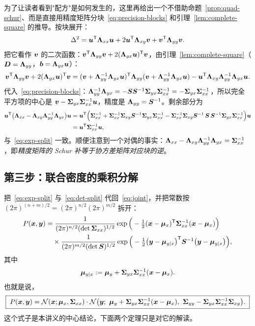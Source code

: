 为了让读者看到"配方"是如何发生的，这里再给出一个不借助命题~\ref{prop:quad-schur}、而是直接用精度矩阵分块~\eqref{eq:precision-blocks} 和引理~\ref{lem:complete-square} 的推导。按块展开：
\[
\Delta^2=\bm{u}^{\mathsf{T}}\bm{\Lambda}_{xx}\bm{u}+2\bm{u}^{\mathsf{T}}\bm{\Lambda}_{xy}\bm{v}+\bm{v}^{\mathsf{T}}\bm{\Lambda}_{yy}\bm{v} .
\]
把它看作 $\bm{v}$ 的二次函数：$\bm{v}^{\mathsf{T}}\bm{\Lambda}_{yy}\bm{v}+2(\bm{\Lambda}_{yx}\bm{u})^{\mathsf{T}}\bm{v}$，由引理~\ref{lem:complete-square}（$\bm{D}=\bm{\Lambda}_{yy}$，$\bm{b}=\bm{\Lambda}_{yx}\bm{u}$）：
\[
\bm{v}^{\mathsf{T}}\bm{\Lambda}_{yy}\bm{v}+2(\bm{\Lambda}_{yx}\bm{u})^{\mathsf{T}}\bm{v}
=(\bm{v}+\bm{\Lambda}_{yy}^{-1}\bm{\Lambda}_{yx}\bm{u})^{\mathsf{T}}\bm{\Lambda}_{yy}(\bm{v}+\bm{\Lambda}_{yy}^{-1}\bm{\Lambda}_{yx}\bm{u})
-\bm{u}^{\mathsf{T}}\bm{\Lambda}_{xy}\bm{\Lambda}_{yy}^{-1}\bm{\Lambda}_{yx}\bm{u} .
\]
代入~\eqref{eq:precision-blocks}：$\bm{\Lambda}_{yy}^{-1}\bm{\Lambda}_{yx}=-\bm{S}\bm{S}^{-1}\bm{\Sigma}_{yx}\bm{\Sigma}_{xx}^{-1}=-\bm{\Sigma}_{yx}\bm{\Sigma}_{xx}^{-1}$，所以完全平方项的中心是 $\bm{v}-\bm{\Sigma}_{yx}\bm{\Sigma}_{xx}^{-1}\bm{u}$，精度是 $\bm{\Lambda}_{yy}=\bm{S}^{-1}$。剩余部分为
\begin{align*}
\bm{u}^{\mathsf{T}}\big(\bm{\Lambda}_{xx}-\bm{\Lambda}_{xy}\bm{\Lambda}_{yy}^{-1}\bm{\Lambda}_{yx}\big)\bm{u}
&=\bm{u}^{\mathsf{T}}\Big(\bm{\Sigma}_{xx}^{-1}+\bm{\Sigma}_{xx}^{-1}\bm{\Sigma}_{xy}\bm{S}^{-1}\bm{\Sigma}_{yx}\bm{\Sigma}_{xx}^{-1}
-\bm{\Sigma}_{xx}^{-1}\bm{\Sigma}_{xy}\bm{S}^{-1}\,\bm{S}\,\bm{S}^{-1}\bm{\Sigma}_{yx}\bm{\Sigma}_{xx}^{-1}\Big)\bm{u}\\
&=\bm{u}^{\mathsf{T}}\bm{\Sigma}_{xx}^{-1}\bm{u} ,
\end{align*}
与~\eqref{eq:exp-split} 一致。顺便注意到一个对偶的事实：$\bm{\Lambda}_{xx}-\bm{\Lambda}_{xy}\bm{\Lambda}_{yy}^{-1}\bm{\Lambda}_{yx}=\bm{\Sigma}_{xx}^{-1}$，即\emph{精度矩阵的 Schur 补等于协方差矩阵对应块的逆}。

\subsection{第三步：联合密度的乘积分解}

把~\eqref{eq:exp-split} 与~\eqref{eq:det-split} 代回~\eqref{eq:joint}，并把常数按 $(2\pi)^{(n+m)/2}=(2\pi)^{n/2}(2\pi)^{m/2}$ 拆开：
\begin{align}
P(\bm{x},\bm{y})
&=\frac{1}{(2\pi)^{n/2}(\det\bm{\Sigma}_{xx})^{1/2}}\exp\Big(-\tfrac12(\bm{x}-\bm{\mu}_x)^{\mathsf{T}}\bm{\Sigma}_{xx}^{-1}(\bm{x}-\bm{\mu}_x)\Big)\notag\\
&\quad\times\frac{1}{(2\pi)^{m/2}(\det\bm{S})^{1/2}}\exp\Big(-\tfrac12\big(\bm{y}-\bm{\mu}_{y|x}\big)^{\mathsf{T}}\bm{S}^{-1}\big(\bm{y}-\bm{\mu}_{y|x}\big)\Big),
\label{eq:product}
\end{align}
其中
\begin{equation}\label{eq:cond-mean}
\bm{\mu}_{y|x}:=\bm{\mu}_y+\bm{\Sigma}_{yx}\bm{\Sigma}_{xx}^{-1}(\bm{x}-\bm{\mu}_x).
\end{equation}
也就是说，
\begin{equation}\label{eq:factor}
\boxed{\;P(\vx,\vy)=\Normal(\vx;\vmu_x,\mSigma_{xx})\cdot\Normal\big(\vy;\ \vmu_y+\mSigma_{yx}\mSigma_{xx}^{-1}(\vx-\vmu_x),\ \mSigma_{yy}-\mSigma_{yx}\mSigma_{xx}^{-1}\mSigma_{xy}\big).\;}
\end{equation}
这个式子是本讲义的中心结论，下面两个定理只是对它的解读。


